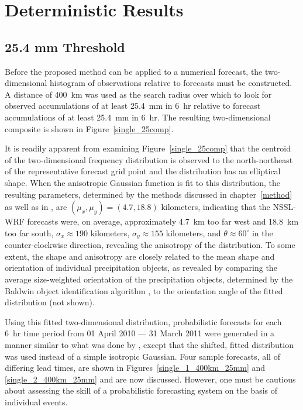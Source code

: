 

\section{Deterministic Results}
\label{dresults}




\subsection{25.4 mm Threshold}
\label{dresults_25.4mm}

Before the proposed method can be applied to a numerical forecast, the two-dimensional histogram of observations relative to forecasts must be constructed.
A distance of \mbox{400 km} was used as the search radius over which to look for observed accumulations of at least \mbox{25.4 mm} in \mbox{6 hr} relative to forecast accumulations of at least \mbox{25.4 mm} in \mbox{6 hr}.
The resulting two-dimensional composite is shown in \mbox{Figure \ref{single_25comp}}.


It is readily apparent from examining \mbox{Figure \ref{single_25comp}} that the centroid of the two-dimensional frequency distribution is observed to the north-northeast of the representative forecast grid point and the distribution has an elliptical shape.
When the anisotropic Gaussian function is fit to this distribution, the resulting parameters, determined by the methods discussed in \mbox{chapter \ref{method}} as well as in \cite{Lak2010}, are $(\mu_x, \mu_y) = (4.7, 18.8)$ kilometers, indicating that the NSSL-WRF forecasts were, on average, approximately \mbox{4.7 km} too far west and \mbox{18.8 km} too far south, $\sigma_x \approx 190$ kilometers, $\sigma_y \approx 155$ kilometers, and $\theta \approx 60^{\circ}$ in the counter-clockwise direction, revealing the anisotropy of the distribution.
To some extent, the shape and anisotropy are closely related to the mean shape and orientation of individual precipitation objects, as revealed by comparing the average size-weighted orientation of the precipitation objects, determined by the Baldwin object identification algorithm \citep{Baldwin2005}, to the orientation angle of the fitted distribution (not shown).


Using this fitted two-dimensional distribution, probabilistic forecasts for each \mbox{6 hr} time period from 01 April 2010 --- 31 March 2011 were generated in a manner similar to what was done by \cite{Sobash2011}, except that the shifted, fitted distribution was used instead of a simple isotropic Gaussian.
Four sample forecasts, all of differing lead times, are shown in \mbox{Figures \ref{single_1_400km_25mm}} and \ref{single_2_400km_25mm} and are now discussed.
However, one must be cautious about assessing the skill of a probabilistic forecasting system on the basis of individual events.


